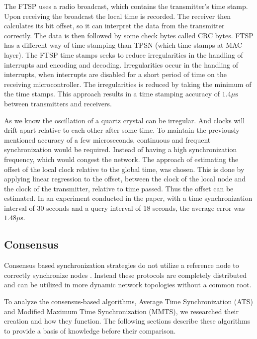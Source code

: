 \documentclass[a4paper,12pt]{article}
\begin{document}
    The FTSP uses a radio broadcast, which contains the transmitter's time stamp. Upon receiving the broadcast the local time is recorded. The receiver then calculates its bit offset, so it can interpret the data from the transmitter correctly. The data is then followed by some check bytes called CRC bytes. FTSP has a different way of time stamping than TPSN (which time stamps at MAC layer). The FTSP time stamps seeks to reduce irregularities in the handling of interrupts and encoding and decoding. Irregularities occur in the handling of interrupts, when interrupts are disabled for a short period of time on the receiving microcontroller. The irregularities is reduced by taking the minimum of the time stamps. This approach results in a time stamping accuracy of $1.4 \mu \text{s}$ between transmitters and receivers.
    
    
    As we know the oscillation of a quartz crystal can be irregular. And clocks will drift apart relative to each other after some time. To maintain the previously mentioned accuracy of a few microseconds, continuous and frequent synchronization would be required. Instead of having a high synchronization frequency, which would congest the network. The approach of estimating the offset of the local clock relative to the global time, was chosen. This is done by applying linear regression to the offset, between the clock of the local node and the clock of the transmitter, relative to time passed. Thus the offset can be estimated. In an experiment conducted in the paper, with a time synchronization interval of 30 seconds and a query interval of 18 seconds, the average error was $1.48 \mu \text{s}$.
    
    
    \subsection{Consensus}
    Consensus based synchronization strategies do not utilize a reference node to correctly synchronize nodes \cite{HeLiChenCheng13}. Instead these protocols are completely distributed and can be utilized in more dynamic network topologies without a common root.
    
    To analyze the consensus-based algorithms, Average Time Synchronization (ATS) and Modified Maximum Time Synchronization (MMTS), we researched their creation and how they function. The following sections describe these algorithms to provide a basis of knowledge before their comparison.
    
\end{document}

